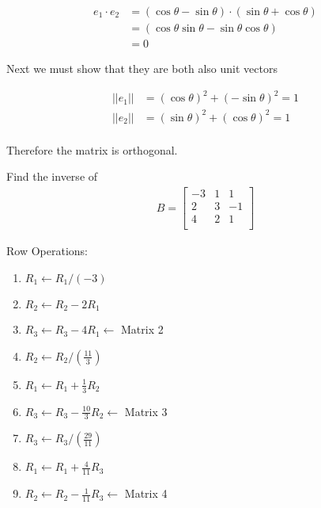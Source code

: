 \documentclass[a4paper]{article}
\begin{document}
\begin{align*}
	e_1 \cdot e_2 &= (\cos\theta - \sin\theta) \cdot (\sin\theta + \cos\theta) \\
	&= (\cos\theta\sin\theta - \sin\theta\cos\theta) \\
	&= 0
\end{align*}

Next we must show that they are both also unit vectors

\begin{align*}
	||e_1|| &= (\cos\theta)^2 + (-\sin\theta)^2 = 1 \\
	||e_2|| &= (\sin\theta)^2 + (\cos\theta)^2 = 1 \\
\end{align*}

Therefore the matrix is orthogonal.

\begin{question}
	Find the inverse of 
	\begin{align*}
		B =
		\left[
		\begin{matrix}
			-3 & 1 & 1 \\
			2 & 3 & -1 \\
			4 & 2 & 1 \\
		\end{matrix}
		\right]
	\end{align*}
\end{question}

Row Operations:
\begin{enumerate}
	\item \(R_1 \leftarrow R_1/(-3)\)
	\item \(R_2 \leftarrow R_2 - 2R_1\)
	\item \(R_3 \leftarrow R_3 - 4R_1 \leftarrow\) Matrix 2 
	\item \(R_2 \leftarrow R_2/(\frac{11}{3})\)
	\item \(R_1 \leftarrow R_1 + \frac{1}{3}R_2\)
	\item \(R_3 \leftarrow R_3 - \frac{10}{3}R_2\leftarrow\) Matrix 3 
	\item \(R_3 \leftarrow R_3/(\frac{29}{11})\)
	\item \(R_1 \leftarrow R_1 + \frac{4}{11}R_3\)
	\item \(R_2 \leftarrow R_2 - \frac{1}{11}R_3\leftarrow\) Matrix 4
\end{enumerate}
\end{document}
